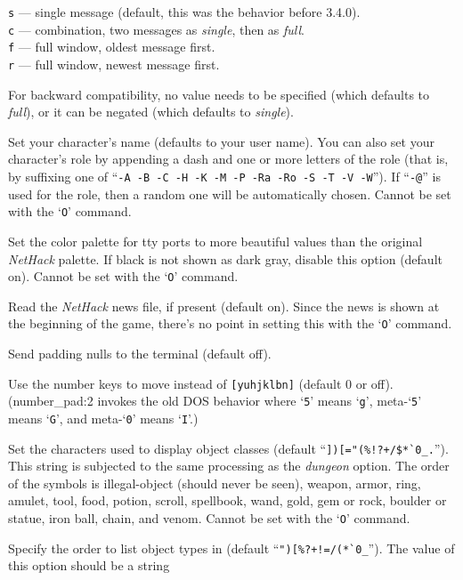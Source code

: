 {\tt s} --- single message (default, this was the behavior before 3.4.0).\\
{\tt c} --- combination, two messages as {\it single\/}, then as {\it full\/}.\\
{\tt f} --- full window, oldest message first.\\
{\tt r} --- full window, newest message first.

For backward compatibility, no value needs to be specified (which
defaults to {\it full\/}), or it can be negated (which defaults
to {\it single\/}). 
\item[\ib{name}]
Set your character's name (defaults to your user name).  You can also
set your character's role by appending a dash and one or more letters of
the role (that is, by suffixing one of
``{\tt -A -B -C -H -K -M -P -Ra -Ro -S -T -V -W}'').
If ``{\tt -@}'' is used for the role, then a random one will be
automatically chosen.
Cannot be set with the `{\tt O}' command.
\item[\ib{newcolors}]
Set the color palette for tty ports to more beautiful values
than the original {\it NetHack\/} palette. If black is not shown as dark gray,
disable this option (default on).
Cannot be set with the `{\tt O}' command.
\item[\ib{news}]
Read the {\it NetHack\/} news file, if present (default on).
Since the news is shown at the beginning of the game, there's no point
in setting this with the `{\tt O}' command.
\item[\ib{null}]
Send padding nulls to the terminal (default off).
\item[\ib{number\_pad}]
Use the number keys to move instead of {\tt [yuhjklbn]} (default 0 or off).
(number\_pad:2 invokes the old DOS behavior where `{\tt 5}' means `{\tt g}', 
meta-`{\tt 5}' means `{\tt G}',  and meta-`{\tt 0}' means `{\tt I}'.)
\item[\ib{objects}]
Set the characters used to display object classes (default
``\verb&])[="(%!?+/$*`0_.&'').
This string is subjected to the same processing as the {\it dungeon\/} option.
The order of the symbols is
illegal-object (should never be seen), weapon, armor, ring, amulet, tool,
food, potion, scroll, spellbook, wand, gold, gem or rock, boulder or statue,
iron ball, chain, and venom.
Cannot be set with the `{\tt O}' command.
\item[\ib{packorder}]
Specify the order to list object types in (default
``\verb&")[%?+!=/(*`0_&''). The value of this option should be a string

